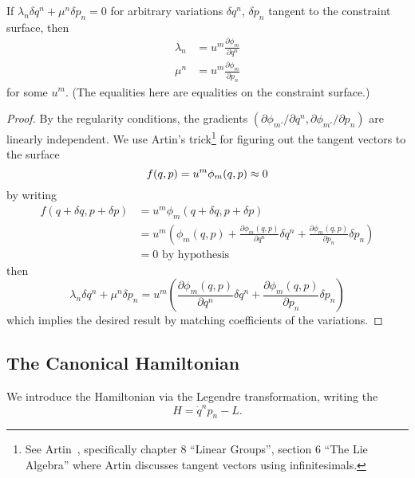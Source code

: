 \begin{thm}\label{thm:variation-tangent-to-constraint-surface}
If $\lambda_{n}\delta q^{n} + \mu^{n}\delta p_{n}=0$ for arbitrary
variations $\delta q^{n}$, $\delta p_{n}$ tangent to the constraint
surface, then
\begin{equation}
  \begin{split}
    \lambda_{n} &= u^{m}\frac{\partial\phi_{m}}{\partial q^{n}}\\
    \mu^{n} &= u^{m}\frac{\partial\phi_{m}}{\partial p_{n}}
  \end{split}
\end{equation}
for some $u^{m}$. (The equalities here are equalities on the constraint
surface.) 
\end{thm}
\begin{proof}
By the regularity conditions, the gradients $(\partial\phi_{m'}/\partial
q^{n},\partial\phi_{m'}/\partial p_{n})$ are linearly independent.
We use Artin's trick\footnote{See Artin~\cite{artin1991}, specifically
chapter 8 ``Linear Groups'', section 6 ``The Lie Algebra'' where Artin
discusses tangent vectors using infinitesimals.} for figuring out the
tangent vectors to the surface
\begin{equation}
f(q,p) = u^{m}\phi_{m}(q,p)\approx 0
\end{equation}
by writing
\begin{subequations}
\begin{align}
f(q+\delta q, p+\delta p) &= u^{m}\phi_{m}(q+\delta q, p+\delta p)\\
&=u^{m}\left(\phi_{m}(q,p)
             + \frac{\partial\phi_{m}(q,p)}{\partial q^{n}}\delta q^{n}
             + \frac{\partial\phi_{m}(q,p)}{\partial p_{n}}\delta p_{n}\right)\\
&=0\mbox{ by hypothesis}
\end{align}
\end{subequations}
then
\begin{equation}
\lambda_{n}\delta q^{n}+\mu^{n}\delta p_{n}
=u^{m}\left(\frac{\partial\phi_{m}(q,p)}{\partial q^{n}}\delta q^{n}
            + \frac{\partial\phi_{m}(q,p)}{\partial p_{n}}\delta p_{n}\right)
\end{equation}
which implies the desired result by matching coefficients of the variations.
\end{proof}


\subsection{The Canonical Hamiltonian}
\begin{defn}
We introduce the Hamiltonian via the Legendre transformation, writing
the 
\begin{equation}
H = \dot{q}^{n}p_{n} - L.
\end{equation}
\end{defn}

